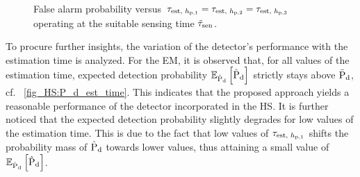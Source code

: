 \begin{figure}[!t]

\centering
{}
\caption{False alarm probability versus $\tau_{\text{est, $h_{\text{p,1}}$}} = \tau_{\text{est, $h_{\text{p,2}}$}} = \tau_{\text{est, $h_{\text{p,3}}$}}$ operating at the suitable sensing time $\tilde{\tau}_{\text{sen}}$.}
\label{fig_HS:P_f_est_time}
\end{figure}

To procure further insights, the variation of the detector's performance with the estimation time is analyzed. For the EM, it is observed that, for all values of the estimation time, expected detection probability ${\mathbb E}_{\hat{\text{P}}_{\text{d}}}\left[ \hat{\text{P}}_{\text{d}} \right]$ strictly stays above $\bar{\text{P}}_{\text{d}}$, cf. \figurename~\ref{fig_HS:P_d_est_time}. This indicates that the proposed approach yields a reasonable performance of the detector incorporated in the HS. It is further noticed that the expected detection probability slightly degrades for low values of the estimation time. This is due to the fact that low values of $\tau_{\text{est, $h_{\text{p,1}}$}}$ shifts the probability mass of $\hat{\text{P}}_{\text{d}}$ towards lower values, thus attaining a small value of ${\mathbb E}_{\hat{\text{P}}_{\text{d}}}\left[ \hat{\text{P}}_{\text{d}} \right]$. 

